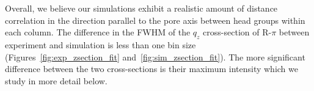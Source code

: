   Overall, we believe our simulations exhibit a realistic amount of distance
  correlation in the direction parallel to the pore axis between head groups
  within each column. The difference in the FWHM of the $q_z$ cross-section of
  R-$\pi$ between experiment and simulation is less than one bin size
  (Figures~\ref{fig:exp_zsection_fit} and~\ref{fig:sim_zsection_fit}). The more
  significant difference between the two cross-sections is their maximum intensity
  which we study in more detail below.
  

